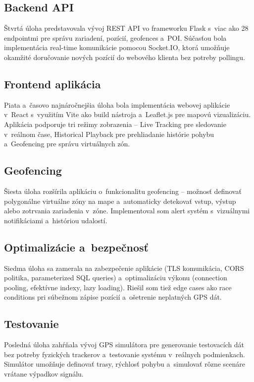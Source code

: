 \subsection{Backend API}
\label{sec:UlohaAPI}

Štvrtá úloha predstavovala vývoj REST API vo frameworku Flask s~viac ako 28 endpointmi pre správu zariadení, pozícií, geofences a~POI. Súčasťou bola implementácia real-time komunikácie pomocou Socket.IO, ktorá umožňuje okamžité doručovanie nových pozícií do webového klienta bez potreby pollingu.

\subsection{Frontend aplikácia}
\label{sec:UlohaFrontend}

Piata a~časovo najnáročnejšia úloha bola implementácia webovej aplikácie v~React s~využitím Vite ako build nástroja a~Leaflet.js pre mapovú vizualizáciu. Aplikácia podporuje tri režimy zobrazenia -- Live Tracking pre sledovanie v~reálnom čase, Historical Playback pre prehliadanie histórie pohybu a~Geofencing pre správu virtuálnych zón.

\subsection{Geofencing}
\label{sec:UlohaGeofencing}

Šiesta úloha rozšírila aplikáciu o~funkcionalitu geofencing -- možnosť definovať polygonálne virtuálne zóny na mape a~automaticky detekovať vstup, výstup alebo zotrvania zariadenia v~zóne. Implementoval som alert systém s~vizuálnymi notifikáciami a~históriou udalostí.

\subsection{Optimalizácie a~bezpečnosť}
\label{sec:UlohaOptimalizacie}

Siedma úloha sa zamerala na zabezpečenie aplikácie (TLS komunikácia, CORS politika, parameterized SQL queries) a~optimalizáciu výkonu (connection pooling, efektívne indexy, lazy loading). Riešil som tiež edge cases ako race conditions pri súbežnom zápise pozícií a~ošetrenie neplatných GPS dát.

\subsection{Testovanie}
\label{sec:UlohaTesting}

Posledná úloha zahŕňala vývoj GPS simulátora pre generovanie testovacích dát bez potreby fyzických trackerov a~testovanie systému v~reálnych podmienkach. Simulátor umožňuje definovať trasy, rýchlosť pohybu a~simulovať rôzne scenáre vrátane výpadkov signálu.

\endinput
